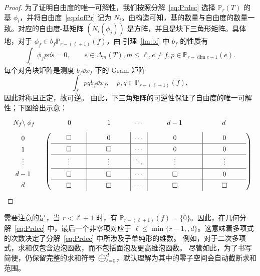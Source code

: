 \begin{proof}
为了证明自由度的唯一可解性，我们按照分解~\eqref{eq:Prdec} 选择 $\mathbb{P}_r(T)$ 的基 ${\phi_i}$，并将自由度~\eqref{eq:dofPr} 记为 ${N_i}$。由构造可知，基的数量与自由度的数量一致。对应的自由度-基矩阵 $(N_i(\phi_j))$ 是方阵，并且是块下三角形矩阵。具体地，对于 $\phi_f \in b_f \mathbb{P}_{r-(\ell+1)}(f)$，由 引理~\ref{lm:bf} 中 $b_f$ 的性质有
\[
\int_{e}\phi_{f} p\dd s=  0, \quad \quad e \in \Delta_m(T), m\leq \ell, e\neq f, p\in \mathbb P_{r-\dim e - 1}(e).
\]
每个对角块矩阵是测度 $b_f \dd x_f$ 下的 Gram 矩阵
$$
\int_f p q b_f \dd x_f, \quad p, q \in \mathbb P_{r-(\ell + 1)}(f),
$$
因此对称且正定，故可逆。
由此，下三角矩阵的可逆性保证了自由度的唯一可解性；下图给出示意：
\begin{equation}\label{eq:lowertriangular}
\renewcommand{\arraystretch}{1.35}
\begin{array}{cc}
\begin{array}{c}
 \; N_f \backslash \;   \phi_f 
\end{array}
 &  
\begin{array}{>{\hfil$}m{1.5cm}<{$\hfil} >{\hfil$}m{1.9cm}<{$\hfil} >{\hfil$}m{0.5cm}<{$\hfil} >{\hfil$}m{2.5cm}<{$\hfil} >{\hfil$}m{1.9cm}<{$\hfil}}
0 & 1 & \cdots	& d-1 & d 
\end{array}
\medskip
\\
\begin{array}{c}
0 \\ 1 \\ \vdots \\ d-1 \\ d
\end{array} 
& \left(
\begin{array}{>{\hfil$}m{1.5cm}<{$\hfil}|>{\hfil$}m{1.9cm}<{$\hfil}|>{\hfil$}m{0.5cm}<{$\hfil}|>{\hfil$}m{2.5cm}<{$\hfil}|>{\hfil$}m{1.9cm}<{$\hfil}}
\square & 0 & \cdots	& 0 & 0 \\
\hline
\square & \square & \cdots	& 0 & 0 \\
\hline
\vdots & \vdots & \ddots	& \vdots & \vdots \\
\hline
\square & \square & \cdots	& \square & 0 \\
\hline
\square & \square & \cdots	& \square& \square 
\end{array}
\right)
\end{array}
\end{equation}
\end{proof}
\begin{remark}\rm
需要注意的是，当 $r < \ell + 1$ 时，有 $\mathbb{P}_{r-(\ell+1)}(f) = \{0\}$。因此，在几何分解~\eqref{eq:Prdec} 中，最后一个非零项对应于 $\ell \le \min\{r-1,, d\}$。这意味着多项式的次数决定了分解~\eqref{eq:Prdec} 中所涉及子单纯形的维数。
例如，对于二次多项式，求和仅包含边泡函数，而不包括面泡及更高维泡函数。
尽管如此，为了书写简便，仍保留完整的求和符号 $\Oplus_{\ell=0}^d$，默认理解为其中的零子空间会自动截断求和范围。
\end{remark}


